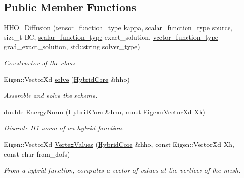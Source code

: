 \subsection*{Public Member Functions}
\begin{DoxyCompactItemize}
\item 
\hyperlink{group__HHO__Diffusion_ga32ee13003e4eda510daa25737fa60e47}{H\+H\+O\+\_\+\+Diffusion} (\hyperlink{classHArDCore2D_1_1HHO__Diffusion_af2d9bd4031a898a3619812343aa5c2c9}{tensor\+\_\+function\+\_\+type} kappa, \hyperlink{classHArDCore2D_1_1HHO__Diffusion_abe94c05310207687b5f3a4af2ea1c97b}{scalar\+\_\+function\+\_\+type} source, size\+\_\+t BC, \hyperlink{classHArDCore2D_1_1HHO__Diffusion_abe94c05310207687b5f3a4af2ea1c97b}{scalar\+\_\+function\+\_\+type} exact\+\_\+solution, \hyperlink{classHArDCore2D_1_1HHO__Diffusion_adad1657301e86deba6abcb5e7e6048e4}{vector\+\_\+function\+\_\+type} grad\+\_\+exact\+\_\+solution, std\+::string solver\+\_\+type)
\begin{DoxyCompactList}\small\item\em Constructor of the class. \end{DoxyCompactList}\item 
Eigen\+::\+Vector\+Xd \hyperlink{group__HHO__Diffusion_ga1aebf22f19de92c115aed69ba394de88}{solve} (\hyperlink{classHArDCore2D_1_1HybridCore}{Hybrid\+Core} \&hho)
\begin{DoxyCompactList}\small\item\em Assemble and solve the scheme. \end{DoxyCompactList}\item 
double \hyperlink{group__HHO__Diffusion_ga1f21d17ee818df40d6c0081300c44982}{Energy\+Norm} (\hyperlink{classHArDCore2D_1_1HybridCore}{Hybrid\+Core} \&hho, const Eigen\+::\+Vector\+Xd Xh)
\begin{DoxyCompactList}\small\item\em Discrete H1 norm of an hybrid function. \end{DoxyCompactList}\item 
Eigen\+::\+Vector\+Xd \hyperlink{group__HHO__Diffusion_ga2b77651b50be012339ca136f4fd90e81}{Vertex\+Values} (\hyperlink{classHArDCore2D_1_1HybridCore}{Hybrid\+Core} \&hho, const Eigen\+::\+Vector\+Xd Xh, const char from\+\_\+dofs)
\begin{DoxyCompactList}\small\item\em From a hybrid function, computes a vector of values at the vertices of the mesh. \end{DoxyCompactList}\item 

\end{DoxyCompactItemize}
